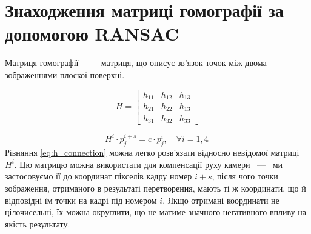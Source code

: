 \section{Знаходження матриці гомографії за допомогою RANSAC}

Матриця гомографії ~---~ матриця, що описує зв'язок точок між двома зображеннями плоскої поверхні.

\begin{equation}
    H =
    \begin{bmatrix}
        h_{11} & h_{12} & h_{13} \\
        h_{21} & h_{22} & h_{13} \\
        h_{31} & h_{32} & h_{33}
    \end{bmatrix}
    \label{eq:h_matrix}
\end{equation}

\begin{equation}
    H^{i} \cdot p_{j}^{i + s} = c \cdot p_{j}^{i},\quad\forall i = \overline{1,4\ }
    \label{eq:h_connection}
\end{equation}
Рівняння \eqref{eq:h_connection} можна легко розв'язати відносно невідомої матриці
\(H^{i}\). Цю матрицю можна використати для компенсації руху камери
~---~ ми застосовуємо її до координат пікселів кадру номер \(i + s\), після
чого точки зображення, отриманого в результаті перетворення, мають ті ж
координати, що й відповідні їм точки на кадрі під номером \(i\). Якщо
отримані координати не цілочисельні, їх можна округлити, що не матиме
значного негативного впливу на якість результату.

